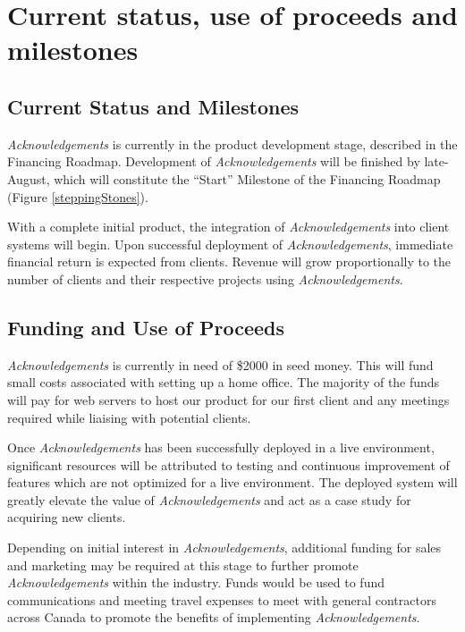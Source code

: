 \section{Current status, use of proceeds and milestones}

\subsection{Current Status and Milestones}
{\it Acknowledgements} is currently in the product development stage, described in the Financing Roadmap. Development of {\it Acknowledgements} will be finished by late-August, which will constitute the ``Start'' Milestone of the Financing Roadmap (Figure \ref{steppingStones}). 

With a complete initial product, the integration of {\it Acknowledgements} into client systems will begin. Upon successful deployment of {\it Acknowledgements}, immediate financial return is expected from clients. Revenue will grow proportionally to the number of clients and their respective projects using {\it Acknowledgements}.

\subsection{Funding and Use of Proceeds}
{\it Acknowledgements} is currently in need of \$2000 in seed money. This will fund small costs associated with setting up a home office. The majority of the funds will pay for web servers to host our product for our first client and any meetings required while liaising with potential clients.

Once {\it Acknowledgements} has been successfully deployed in a live environment, significant resources will be attributed to testing and continuous improvement of features which are not optimized for a live environment. The deployed system will greatly elevate the value of {\it Acknowledgements} and act as a case study for acquiring new clients. 

Depending on initial interest in {\it Acknowledgements}, additional funding for sales and marketing may be required at this stage to further promote {\it Acknowledgements} within the industry. Funds would be used to fund communications and meeting travel expenses to meet with general contractors across Canada to promote the benefits of implementing {\it Acknowledgements}.